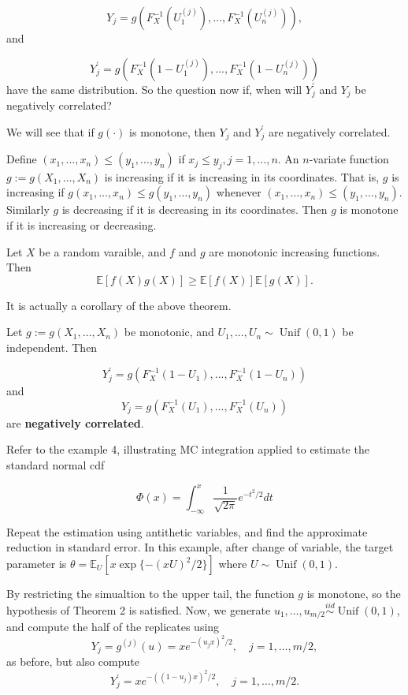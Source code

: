 \documentclass[
  letterpaper,
  DIV=11,
  numbers=noendperiod]{scrreprt}
\begin{document}
\[ Y_j = g(F^{−1}_X(U^{(j)}_1 ), \dots , F^{−1}_X(U_n^{(j)})),\] and

\[ Y_j^\prime = g(F^{−1}_X(1-U^{(j)}_1 ), . . . , F^{−1}_X(1-U_n^{(j)}))\]
have the same distribution. So the question now if, when will
\(Y_j^{\prime}\) and \(Y_j\) be negatively correlated?

We will see that if \(g(\cdot)\) is monotone, then \(Y_j\) and
\(Y_j^{\prime}\) are negatively correlated.

Define \((x_1, . . . , x_n) \le (y_1, \dots , y_n)\) if
\(x_j ≤ y_j, j = 1, \dots, n\). An \(n\)-variate function
\(g := g(X_1, \dots, X_n)\) is increasing if it is increasing in its
coordinates. That is, \(g\) is increasing if
\(g(x_1,\dots, x_n) \le g(y_1, \dots, y_n)\) whenever
\((x_1, \dots , x_n) \le (y_1, . . . , y_n)\). Similarly \(g\) is
decreasing if it is decreasing in its coordinates. Then \(g\) is
monotone if it is increasing or decreasing.

Let \(X\) be a random varaible, and \(f\) and \(g\) are monotonic
increasing functions. Then \[
\mathbb{E}[f(X)g(X)] \ge \mathbb{E}[f(X)]\mathbb{E}[g(X)].
\]

It is actually a corollary of the above theorem.

Let \(g := g(X_1, \dots, X_n)\) be monotonic, and
\(U_1, \dots, U_n \sim \operatorname{Unif}(0,1)\) be independent. Then

\[ Y_j^\prime = g(F^{−1}_X(1-U_1 ), . . . , F^{−1}_X(1-U_n))\] and
\[ Y_j = g(F^{−1}_X(U_1 ), . . . , F^{−1}_X(U_n))\] are
\textbf{negatively correlated}.

Refer to the example 4, illustrating MC integration applied to estimate
the standard normal cdf

\[
\Phi(x)=\int_{-\infty}^x \frac{1}{\sqrt{2 \pi}} e^{-t^2 / 2} d t
\]

Repeat the estimation using antithetic variables, and find the
approximate reduction in standard error. In this example, after change
of variable, the target parameter is
\(\theta = \mathbb{E}_U[x\exp\{-(xU)^2/2\}]\) where
\(U\sim\operatorname{Unif}(0,1)\).

By restricting the simualtion to the upper tail, the function \(g\) is
monotone, so the hypothesis of Theorem 2 is satisfied. Now, we generate
\(u_1,\dots,u_{m/2}\overset{iid}{\sim}\operatorname{Unif}(0,1)\), and
compute the half of the replicates using \[
Y_j=g^{(j)}(u)=x e^{-\left(u_j x\right)^2 / 2}, \quad j=1, \ldots, m / 2,
\] as before, but also compute \[
Y_j^{\prime}=x e^{-\left(\left(1-u_j\right) x\right)^2 / 2}, \quad j=1, \ldots, m / 2 .
\]
\end{document}
